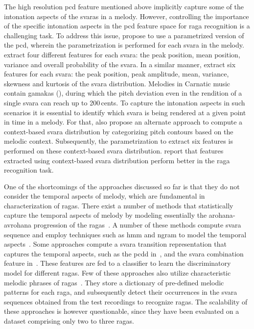 The high resolution \gls{pcd} feature mentioned above implicitly capture some of the intonation aspects of the \glspl{svara} in a melody. However, controlling the importance of the specific intonation aspects in the \gls{pcd} feature space for \gls{raga} recognition is a challenging task. To address this issue, \cite{belle2009raga,koduri2014intonation} propose to use a parametrized version of the \gls{pcd}, wherein the parametrization is performed for each \gls{svara} in the melody. \cite{belle2009raga} extract four different features for each \gls{svara}: the peak position, mean position, variance and overall probability of the \gls{svara}. In a similar manner, \cite{koduri2014intonation} extract six features for each \gls{svara}: the peak position, peak amplitude, mean, variance, skewness and kurtosis of the \gls{svara} distribution. Melodies in Carnatic music contain \glspl{gamaka} (), during which the pitch deviation even in the rendition of a single \gls{svara} can reach up to 200\,cents. To capture the intonation aspects in such scenarios it is essential to identify which \gls{svara} is being rendered at a given point in time in a melody. For that, \cite{koduri2014intonation} also propose an alternate approach to compute a context-based \gls{svara} distribution by categorizing pitch contours based on the melodic context. Subsequently, the parametrization to extract six features is performed on these context-based \gls{svara} distribution. \cite{koduri2014intonation} report that features extracted using context-based \gls{svara} distribution perform better in the \gls{raga} recognition task.

One of the shortcomings of the approaches discussed so far is that they do not consider the temporal aspects of melody, which are fundamental in characterization of \glspl{raga}. There exist a number of methods that statistically capture the temporal aspects of melody by modeling essentially the \gls{arohana}-\gls{avrohana} progression of the \glspl{raga}~\citep{pandey2003tansen,chordia2007raag,Shetty2009,sridhar2009raga,dighe2013scale,kumar2014identifying}. A number of these methods compute \gls{svara} sequence and employ techniques such as \gls{hmm} and \acrshort{ngram} to model the temporal aspects~\citep{pandey2003tansen,dighe2013scale,kumar2014identifying}. Some approaches compute a \gls{svara} transition representation that captures the temporal aspects, such as the \gls{pcdd} in~\cite{chordia2007raag}, and the \gls{svara} combination feature in~\cite{Shetty2009}. These features are fed to a classifier to learn the discriminatory model for different \glspl{raga}. Few of these approaches also utilize characteristic melodic phrases of \glspl{raga}~\citep{pandey2003tansen,sridhar2009raga}. They store a dictionary of pre-defined melodic patterns for each \gls{raga}, and subsequently detect their occurrences in the \gls{svara} sequences obtained from the test recordings to recognize \glspl{raga}. The scalability of these approaches is however questionable, since they have been evaluated on a dataset comprising only two to three \glspl{raga}. 

